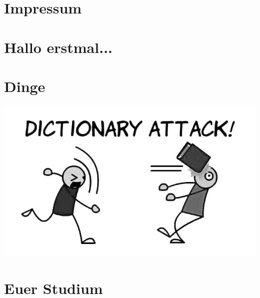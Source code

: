 \documentclass[12pt,a4paper]{scrartcl}
\begin{document}


\setcounter{tocdepth}{2} %
\tableofcontents
\newpage



\section{Impressum}

\newpage

\section{Hallo erstmal...}

\newpage

\label{glossar}
\section{Dinge}

\begin{center}
	\includegraphics[scale=0.5]{comics/dictionary-attack}
\end{center}

\section{Euer Studium}
\end{document}
